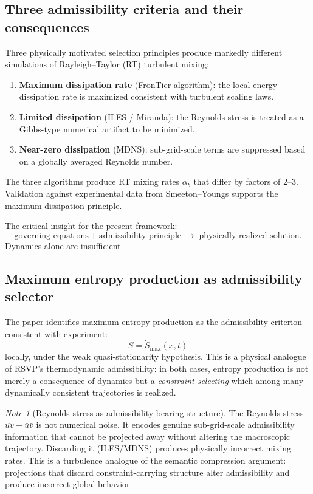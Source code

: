 \documentclass[12pt, a4paper]{article}
\theoremstyle{plain}
\theoremstyle{definition}
\theoremstyle{remark}
\newtheorem{note}[theorem]{Note}
\begin{document}
\subsection{Three admissibility criteria and their consequences}

Three physically motivated selection principles produce markedly
different simulations of Rayleigh--Taylor (RT) turbulent mixing:
\begin{enumerate}
  \item \textbf{Maximum dissipation rate} (FronTier algorithm):
        the local energy dissipation rate is maximized consistent with
        turbulent scaling laws.
  \item \textbf{Limited dissipation} (ILES / Miranda):
        the Reynolds stress is treated as a Gibbs-type numerical
        artifact to be minimized.
  \item \textbf{Near-zero dissipation} (MDNS):
        sub-grid-scale terms are suppressed based on a
        globally averaged Reynolds number.
\end{enumerate}
The three algorithms produce RT mixing rates $\alpha_b$ that differ
by factors of 2--3.
Validation against experimental data from Smeeton--Youngs supports the
maximum-dissipation principle.

The critical insight for the present framework:
\[
  \text{governing equations} + \text{admissibility principle}
  \;\longrightarrow\;
  \text{physically realized solution.}
\]
Dynamics alone are insufficient.

\subsection{Maximum entropy production as admissibility selector}

The paper identifies maximum entropy production as the admissibility
criterion consistent with experiment:
\[
  \dot{S} = \dot{S}_{\max}(x, t)
\]
locally, under the weak quasi-stationarity hypothesis.
This is a physical analogue of RSVP's thermodynamic admissibility:
in both cases, entropy production is not merely a consequence of
dynamics but a \emph{constraint selecting} which among many dynamically
consistent trajectories is realized.

\begin{note}[Reynolds stress as admissibility-bearing structure]
  The Reynolds stress $\overline{uv} - \bar{u}\bar{v}$ is not
  numerical noise.
  It encodes genuine sub-grid-scale admissibility information that
  cannot be projected away without altering the macroscopic trajectory.
  Discarding it (ILES/MDNS) produces physically incorrect mixing rates.
  This is a turbulence analogue of the semantic compression argument:
  projections that discard constraint-carrying structure alter
  admissibility and produce incorrect global behavior.
\end{note}
\end{document}
